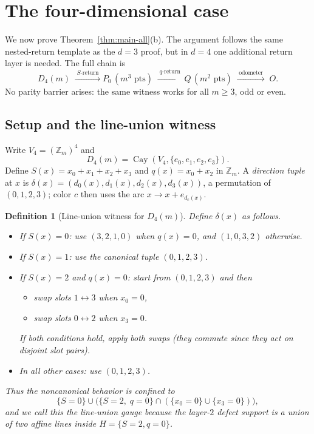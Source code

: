 \documentclass[11pt]{article}
\newtheorem{definition}{Definition}
\newcommand{\Zm}{\mathbb Z_m}
\newcommand{\Pzero}{P_0}
\newcommand{\Qslice}{Q}
\begin{document}

\section{The four-dimensional case}\label{sec:d4}

We now prove Theorem~\ref{thm:main-all}(b).
The argument follows the same nested-return template as the $d=3$ proof, but in $d=4$ one additional return layer is needed.
The full chain is
\[
D_4(m)
\;\xrightarrow{\;S\text{-return}\;}
\Pzero\,(m^3\text{ pts})
\;\xrightarrow{\;q\text{-return}\;}
\Qslice\,(m^2\text{ pts})
\;\xrightarrow{\;\text{odometer}\;}\;
O.
\]
No parity barrier arises: the same witness works for all $m\ge 3$, odd or even.

\subsection{Setup and the line-union witness}\label{sec:d4-witness}

Write $V_4=(\Zm)^4$ and
\[
D_4(m)=\operatorname{Cay}(V_4,\{e_0,e_1,e_2,e_3\}).
\]
Define $S(x)=x_0+x_1+x_2+x_3$ and $q(x)=x_0+x_2$ in $\Zm$.
A \emph{direction tuple} at $x$ is $\delta(x)=(d_0(x),d_1(x),d_2(x),d_3(x))$, a permutation of $(0,1,2,3)$; color $c$ then uses the arc $x\to x+e_{d_c(x)}$.

\begin{definition}[Line-union witness for $D_4(m)$]\label{def:d4-witness}
Define $\delta(x)$ as follows.
\begin{itemize}[leftmargin=2em]
\item If $S(x)=0$: use $(3,2,1,0)$ when $q(x)=0$, and $(1,0,3,2)$ otherwise.
\item If $S(x)=1$: use the canonical tuple $(0,1,2,3)$.
\item If $S(x)=2$ and $q(x)=0$: start from $(0,1,2,3)$ and then
  \begin{itemize}[leftmargin=2em]
  \item swap slots $1\leftrightarrow 3$ when $x_0=0$,
  \item swap slots $0\leftrightarrow 2$ when $x_3=0$.
  \end{itemize}
  If both conditions hold, apply both swaps (they commute since they act on disjoint slot pairs).
\item In all other cases: use $(0,1,2,3)$.
\end{itemize}
Thus the noncanonical behavior is confined to
\[
\{S=0\}\cup \bigl(\{S=2,\;q=0\}\cap(\{x_0=0\}\cup\{x_3=0\})\bigr),
\]
and we call this the \emph{line-union gauge} because the layer-$2$ defect support is a union of two affine lines inside $H=\{S=2,q=0\}$.
\end{definition}
\end{document}
